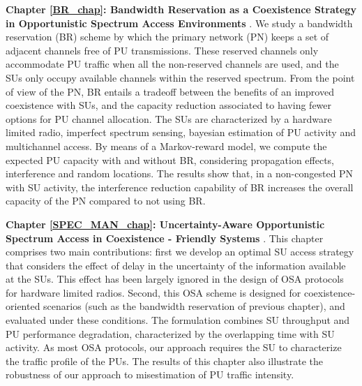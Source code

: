 \textbf{Chapter \ref{BR_chap}: Bandwidth Reservation as a Coexistence Strategy in Opportunistic Spectrum Access Environments} \cite{ref:Alcaraz2014_BR}. We study a bandwidth reservation (BR) scheme by which the primary network (PN) keeps a set of adjacent channels free of PU transmissions. 
These reserved channels only accommodate PU traffic when all the non-reserved channels are used, and the SUs only occupy available channels within the reserved spectrum.
From the point of view of the PN, BR entails a tradeoff between the benefits of an improved coexistence with SUs, and the capacity reduction associated to having fewer options for PU channel allocation.
The SUs are characterized by a hardware limited radio, imperfect spectrum sensing, bayesian estimation of PU activity and multichannel access. 
By means of a Markov-reward model, we compute the expected PU capacity with and without BR, considering propagation effects, interference and random locations.
The results show that, in a non-congested PN with SU activity, the interference reduction capability of BR increases the overall capacity of the PN compared to not using BR.

\textbf{Chapter \ref{SPEC_MAN_chap}: Uncertainty-Aware Opportunistic Spectrum Access in Coexistence - Friendly Systems} \cite{ref:Alcaraz2015_SPEC_MAN}.
This chapter comprises two main contributions: first we develop an optimal SU access strategy that considers the effect of delay in the uncertainty of the information available at the SUs. This effect has been largely ignored in the design of OSA protocols for hardware limited radios. Second, this OSA scheme is designed for coexistence-oriented scenarios (such as the bandwidth reservation of previous chapter), and evaluated under these conditions.
The formulation combines SU throughput and PU performance degradation, characterized by the overlapping time with SU activity.    
As most OSA protocols, our approach requires the SU to characterize the traffic profile of the PUs. The results of this chapter also illustrate the robustness of our approach to misestimation of PU traffic intensity.


